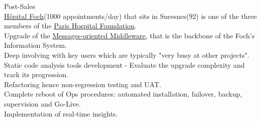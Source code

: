 \begin{cventries}
{\begin{cvitems}
        \item {Post-Sales\\ \href{http://www.hopital-foch.com/hopital/}{Hôpital Foch}(1000 appointments/day) that sits in Suresnes(92) is one of the three members of the \href{http://www.phf.paris/?lang=en}{Paris Hospital Foundation}.\\Upgrade of the \href{https://www.intersystems.com/products/ensemble}{Messages-oriented Middleware}, that is the backbone of the Foch's Information System.\\Deep involving with key users which are typically "very busy at other projects".\\Static code analysis tools development - Evaluate the upgrade complexity and track its progression.\\Refactoring hence non-regression testing and UAT.\\Complete reboot of Ops procedures: automated installation, failover, backup, supervision and Go-Live.\\Implementation of real-time insights.}
      \end{cvitems}
} %


\end{cventries}
